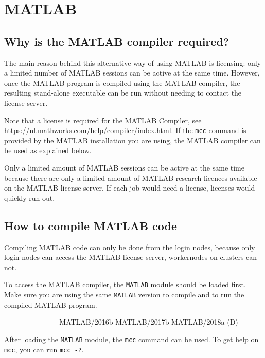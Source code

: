 \chapter{MATLAB}
\label{ch:matlab}

\section{Why is the MATLAB compiler required?}

The main reason behind this alternative way of using MATLAB is licensing: only
a limited number of MATLAB sessions can be active at the same time. However, once
the MATLAB program is compiled using the MATLAB compiler, the resulting stand-alone
executable can be run without needing to contact the license server.

Note that a license is required for the MATLAB Compiler,
see \url{https://nl.mathworks.com/help/compiler/index.html}. If the \lstinline|mcc|
command is provided by the MATLAB installation you are using, the MATLAB compiler
can be used as explained below.

\ifgent
Only a limited amount of MATLAB sessions can be active at the same time because
there are only a limited amount of MATLAB research licences available on
the \university MATLAB license server. If each job would need a license,
licenses would quickly run out.
\fi

\section{How to compile MATLAB code}

Compiling MATLAB code can only be done from the login nodes, because only login
nodes can access the MATLAB license server, workernodes on clusters can not.

To access the MATLAB compiler, the \lstinline|MATLAB| module should be loaded first. Make sure
you are using the same \lstinline|MATLAB| version to compile and to run the compiled MATLAB
program.

\begin{prompt}
----------------------%
   MATLAB/2016b    MATLAB/2017b    MATLAB/2018a (D)
\end{prompt}

After loading the \lstinline|MATLAB| module, the \lstinline|mcc| command can be used. To get help on
\lstinline|mcc|, you can run \lstinline|mcc -?|.

